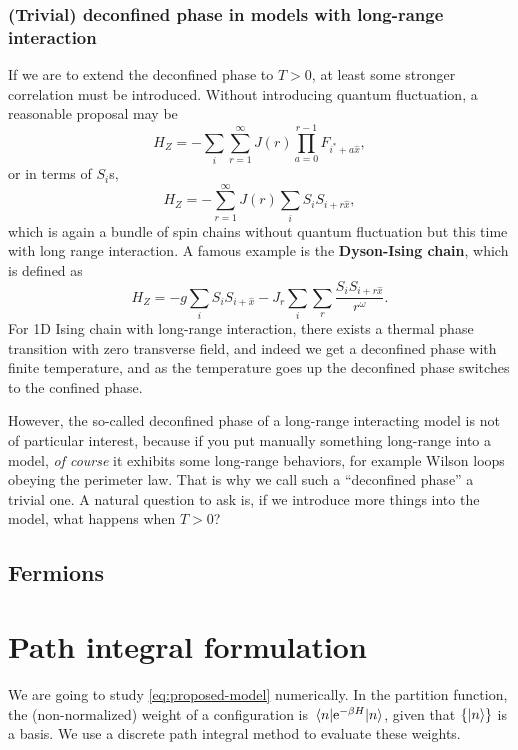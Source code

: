 \documentclass[hyperref, a4paper]{article}
\newcommand*{\ee}{\mathrm{e}}
\newcommand*{\concept}[1]{{\textbf{#1}}}
\begin{document}
\subsubsection{(Trivial) deconfined phase in models with long-range interaction}

If we are to extend the deconfined phase to $T>0$, at least some stronger correlation must be introduced.
Without introducing quantum fluctuation, a reasonable proposal may be 
\[
    H_Z = - \sum_i \sum_{r=1}^\infty J(r) \prod_{a=0}^{r-1} F_{i^*+a \hat{x}},
\]
or in terms of $S_i$s,
\[
    H_Z = - \sum_{r=1}^\infty J(r) \sum_i S_i S_{i + r \hat{x}} ,
\]
which is again a bundle of spin chains without quantum fluctuation but this time with long range interaction.
A famous example is the \concept{Dyson-Ising chain}, which is defined as
\[
    H_Z = - g \sum_i S_i S_{i+\hat{x}} - J_r \sum_{i} \sum_r \frac{S_i S_{i + r \hat{x}}}{r^\omega}.
\]
For 1D Ising chain with long-range interaction, there exists a thermal phase transition with zero transverse field, and indeed we get a deconfined phase with finite temperature, and as the temperature goes up the deconfined phase switches to the confined phase.

However, the so-called deconfined phase of a long-range interacting model is not of particular interest, because if you put manually something long-range into a model, \emph{of course} it exhibits some long-range behaviors, for example Wilson loops obeying the perimeter law.
That is why we call such a ``deconfined phase'' a trivial one.
A natural question to ask is, if we introduce more things into the model, what happens when $T > 0$?

\subsection{Fermions}



\section{Path integral formulation}

We are going to study \eqref{eq:proposed-model} numerically.
In the partition function, the (non-normalized) weight of a configuration is $\mel{n}{\ee^{-\beta H}}{n}$, given that $\{\ket{n}\}$ is a basis.
We use a discrete path integral method to evaluate these weights.
\end{document}
